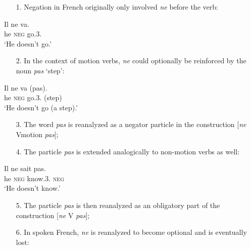 \begin{enumerate}  \item[1.]   Negation in French originally only involved {\em ne} before the verb:
\end{enumerate}
 



\ea
\gll Il ne va.\\
he {\textsc{neg}} go.3{\sg}.{\prs}\\
\glt `He doesn't go.'\\
\z

 \begin{enumerate}  \item[2.]   In the context of motion verbs, {\em ne} could optionally be reinforced by the noun {\em pas} `step':
 \end{enumerate}


\ea
\gll Il ne va (pas).\\
he {\textsc{neg}} go.3{\sg}.{\prs} (step)\\
\glt `He doesn't go (a step).'\\
\z
\begin{enumerate}  \item[3.]  The word {\em pas} is reanalyzed as a negator particle in the construction [{\em ne} Vmotion {\em pas}];
\end{enumerate}

\begin{enumerate}  \item[4.]   The particle {\em pas} is extended analogically to non-motion verbs as well:
\end{enumerate}

 

\ea
\gll Il ne sait pas.\\
he {\textsc{neg}} know.3{\sg}.{\prs} {\textsc{neg}}\\
\glt `He doesn't know.'\\
\z


\begin{enumerate}  \item[5.]  The particle {\em pas} is then reanalyzed as an obligatory part of the construction [{\em ne} V {\em pas}];
\end{enumerate}


\begin{enumerate}  \item[6.]  In spoken French, {\em ne} is reanalyzed to become optional and is eventually lost:
\end{enumerate}
 
